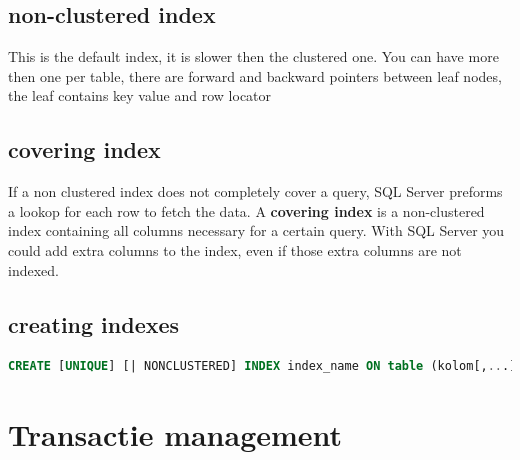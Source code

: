 \documentclass{report}
\begin{document}
		\section{non-clustered index}
			This is the default index, it is slower then the clustered one. You can have more then one per table, there are forward and backward pointers between leaf nodes, the leaf contains key value and row locator
		\section{covering index}
			If a non clustered index does not completely cover a query, SQL Server preforms a lookop for each row to fetch the data. A \textbf{covering index} is a non-clustered index containing all columns necessary for a certain query. With SQL Server you could add extra columns to the index, even if those extra columns are not indexed. 
		\section{creating indexes}
			\begin{lstlisting}[language = sql]
CREATE [UNIQUE] [| NONCLUSTERED] INDEX index_name ON table (kolom[,...])\end{lstlisting}

\chapter{Transactie management}
\end{document}
